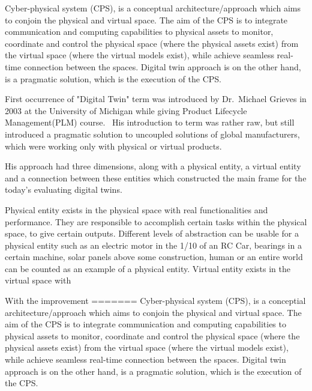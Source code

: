 \documentclass[9pt,conference]{IEEEtran}
\begin{document}
    Cyber-physical system (CPS), is a conceptual architecture/approach which aims to conjoin the physical and virtual space. 
    The aim of the CPS is to integrate communication and computing capabilities to physical assets to monitor, coordinate and control the physical space (where the physical assets exist) from the virtual space (where the virtual models exist), while achieve seamless real-time connection between the spaces.
    Digital twin approach is on the other hand, is a pragmatic solution, which is the execution of the CPS.~\cite{TAO20193}
    
    First occurrence of "Digital Twin" term  was introduced by Dr.~Michael Grieves in 2003 at the University of Michigan while giving  Product Lifecycle Management(PLM) course.~\cite{article}
    His introduction to term was rather raw, but still introduced a pragmatic solution to uncoupled solutions of global manufacturers, which were working only with physical or virtual products.

    His approach had three dimensions, along with a physical entity, a virtual entity and a connection between these entities which constructed the main frame for the today's evaluating digital twins.~\cite{article}

    Physical entity exists in the physical space with real functionalities and performance. They are responsible to accomplish certain tasks within the physical space, to give certain outputs.
    Different levels of abstraction can be usable for a physical entity such as an electric motor in the 1/10 of an RC Car, bearings in a certain machine, solar panels above some construction, human or an entire world can be counted as an example of a physical entity.
    Virtual entity exists in the virtual space with 

    With the improvement 
=======
    Cyber-physical system (CPS), is a conceptial architecture/approach which aims to conjoin the physical and virtual space. 
    The aim of the CPS is to integrate communication and computing capabilities to physical assets to monitor, coordinate and control the physical space (where the physical assets exist)
    from the virtual space (where the virtual models exist), while achieve seamless real-time connection between the spaces.
    Digital twin approach is on the other hand, is a pragmatic solution, which is the execution of the CPS.\cite{TAO20193}
\end{document}
